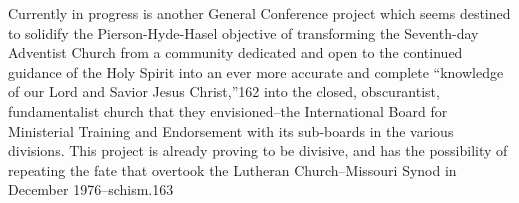 Currently in progress is another General Conference project which seems
destined to solidify the Pierson-Hyde-Hasel objective of transforming the
Seventh-day Adventist Church from a community dedicated and open to the
continued guidance of the Holy Spirit into an ever more accurate and
complete ``knowledge of our Lord and Savior Jesus Christ,''162 into the
closed, obscurantist, fundamentalist church that they envisioned--the
International Board for Ministerial Training and Endorsement with its
sub-boards in the various divisions. This project is already proving to be
divisive, and has the possibility of repeating the fate that overtook the
Lutheran Church--Missouri Synod in December 1976--schism.163
